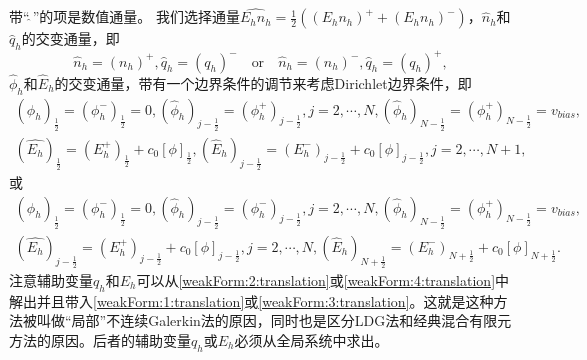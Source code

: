 带“$\hat{\ }$”的项是数值通量。 我们选择通量$\widehat{E_h n_h} = \frac{1}{2}((E_hn_h)^+  + (E_hn_h)^-)$，$\hat{n}_h$和$\hat{q}_h$的交变通量，即
\begin{equation}
    \hat{n}_h = (n_h)^+, \hat{q}_h = (q_h)^- \quad \text{or} \quad \hat{n}_h = (n_h)^-, \hat{q}_h = (q_h)^+, \label{numbericalFlux:n&q:translation}
\end{equation}
$\hat{\phi}_h$和$\hat{E}_h$的交变通量，带有一个边界条件的调节来考虑Dirichlet边界条件，即
\begin{equation}
    \begin{aligned}
        (\hat{\phi}_h)_{\frac{1}{2}} = (\phi_h^-)_{\frac{1}{2}} = 0, (\hat{\phi}_h)_{j-\frac{1}{2}} = (\phi_h^+)_{j-\frac{1}{2}},j = 2,\cdots,N,(\hat{\phi}_h)_{N-\frac{1}{2}} = (\phi_h^+)_{N-\frac{1}{2}} = v_{bias}, \\
        (\hat{E_h})_{\frac{1}{2}} = (E_h^+)_{\frac{1}{2}} + c_0[\phi]_{\frac{1}{2}}, (\hat{E}_h)_{j-\frac{1}{2}} = (E_h^-)_{j-\frac{1}{2}} + c_0[\phi]_{j-\frac{1}{2}},j = 2,\cdots,N+1,
    \end{aligned}\label{numbericalFlux:phi&E:translation}
\end{equation}
或
\begin{equation}
    \begin{aligned}
        (\hat{\phi}_h)_{\frac{1}{2}} = (\phi_h^-)_{\frac{1}{2}} = 0, (\hat{\phi}_h)_{j-\frac{1}{2}} = (\phi_h^-)_{j-\frac{1}{2}},j = 2,\cdots,N,(\hat{\phi}_h)_{N-\frac{1}{2}} = (\phi_h^+)_{N-\frac{1}{2}} = v_{bias}, \\
        (\hat{E_h})_{j - \frac{1}{2}} = (E_h^+)_{j - \frac{1}{2}} + c_0[\phi]_{j-\frac{1}{2}},j = 2,\cdots,N, (\hat{E}_h)_{N+\frac{1}{2}} = (E_h^-)_{N+\frac{1}{2}} + c_0[\phi]_{N+\frac{1}{2}}.
    \end{aligned}\label{numbericalFlux:phi&E alt:translation}
\end{equation}
注意辅助变量$q_h$和$E_h$可以从\eqref{weakForm:2:translation}或\eqref{weakForm:4:translation}中解出并且带入\eqref{weakForm:1:translation}或\eqref{weakForm:3:translation}。这就是这种方法被叫做“局部”不连续Galerkin法的原因，同时也是区分LDG法和经典混合有限元方法的原因。后者的辅助变量$q_h$或$E_h$必须从全局系统中求出。

